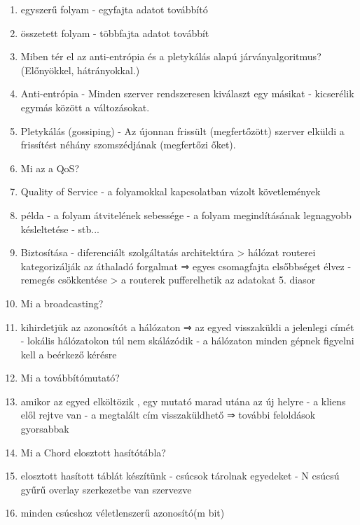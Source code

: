 \documentclass[twoside, a4paper, 12pt]{article}
\begin{document}
\begin{enumerate}
            \item egyszerű folyam
                - egyfajta adatot továbbító
            \item összetett folyam
                - többfajta adatot továbbít
            \item  Miben tér el az anti-entrópia és a pletykálás alapú járványalgoritmus? (Előnyökkel, hátrányokkal.)
            \item Anti-entrópia
                - Minden szerver rendszeresen kiválaszt egy másikat
                - kicserélik egymás között a változásokat.
            \item Pletykálás (gossiping)
                - Az újonnan frissült (megfertőzött) szerver elküldi a frissítést néhány szomszédjának (megfertőzi őket).
            \item  Mi az a QoS?
            \item Quality of Service 
                - a folyamokkal kapcsolatban vázolt követlemények
            \item példa
                - a folyam átvitelének sebessége
                - a folyam megindításának legnagyobb késleltetése
                - stb...
            \item Biztosítása
                - diferenciált szolgáltatás architektúra
                > hálózat routerei kategorizálják az áthaladó forgalmat 
                ⇒ egyes csomagfajta elsőbbséget élvez
                - remegés csökkentése
                > a routerek pufferelhetik az adatokat
                5. diasor
            \item  Mi a broadcasting?
            \item kihirdetjük az azonosítót a hálózaton ⇒ az egyed visszaküldi a jelenlegi címét
                - lokális hálózatokon túl nem skálázódik
                - a hálózaton minden gépnek figyelni kell a beérkező kérésre 
            \item  Mi a továbbítómutató?
            \item amikor az egyed elköltözik , egy mutató marad utána az új helyre
                - a kliens elől rejtve van
                - a megtalált cím visszaküldhető ⇒ további feloldások gyorsabbak
            \item  Mi a Chord elosztott hasítótábla?
            \item elosztott hasított táblát készítünk
                - csúcsok tárolnak egyedeket
                - N csúcsú gyűrű overlay szerkezetbe van szervezve
            \item minden csúcshoz véletlenszerű azonosító(m bit)

\end{enumerate}
\end{document}
